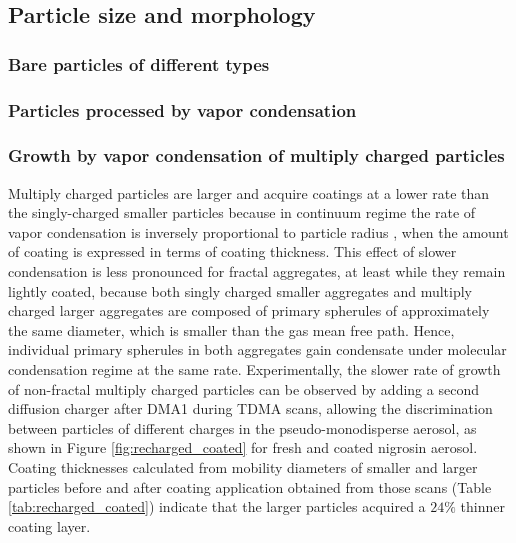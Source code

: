 \subsection{Particle size and morphology}

\subsubsection{Bare particles of different types}



\subsubsection{Particles processed by vapor condensation}



\subsubsection{Growth by vapor condensation of multiply charged particles}

Multiply charged particles are larger and acquire coatings at a lower rate than the singly-charged smaller particles because in continuum regime the rate of vapor condensation is inversely proportional to particle radius \citep{RN2}, when the amount of coating is expressed in terms of coating thickness. This effect of slower condensation is less pronounced for fractal aggregates, at least while they remain lightly coated, because both singly charged smaller aggregates and multiply charged larger aggregates are composed of primary spherules of approximately the same diameter, which is smaller than the gas mean free path. Hence, individual primary spherules in both aggregates gain condensate under molecular condensation regime at the same rate. Experimentally, the slower rate of growth of non-fractal multiply charged particles can be observed by adding a second diffusion charger after DMA1 during TDMA scans, allowing the discrimination between particles of different charges in the pseudo-monodisperse aerosol, as shown in Figure \ref{fig:recharged_coated} for fresh and coated nigrosin aerosol. Coating thicknesses calculated from mobility diameters of smaller and larger particles before and after coating application obtained from those scans (Table \ref{tab:recharged_coated}) indicate that the larger particles acquired a $24\%$ thinner coating layer.


